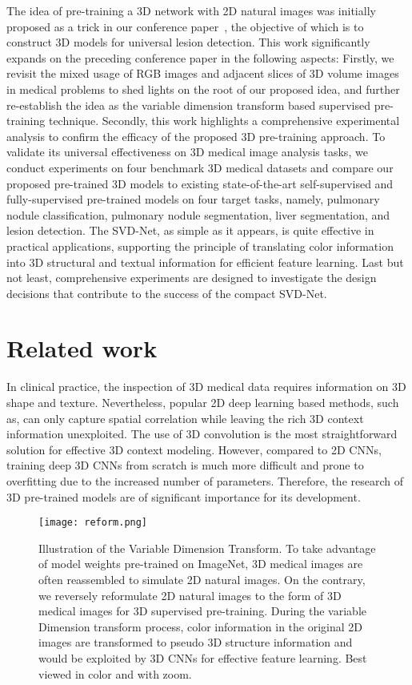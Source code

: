\documentclass[journal,twoside,web]{ieeecolor}
\begin{document}
The idea of pre-training a 3D network with 2D natural images was initially proposed as a trick in our conference paper~\cite{zhang2020revisiting}, the objective of which is to construct 3D models for universal lesion detection. This work significantly expands on the preceding conference paper in the following aspects: Firstly, we revisit the mixed usage of RGB images and adjacent slices of 3D volume images in medical problems to shed lights on the root of our proposed idea, and further re-establish the idea as the variable dimension transform based supervised pre-training technique. Secondly, this work highlights a comprehensive experimental analysis to confirm the efficacy of the proposed 3D pre-training approach. To validate its universal effectiveness on 3D medical image analysis tasks, we conduct experiments on four benchmark 3D medical datasets and compare our proposed pre-trained 3D models to existing state-of-the-art self-supervised and fully-supervised pre-trained models on four target tasks, namely, pulmonary nodule classification, pulmonary nodule segmentation, liver segmentation, and lesion detection. The SVD-Net, as simple as it appears, is quite effective in practical applications, supporting the principle of translating color information into 3D structural and textual information for efficient feature learning. Last but not least, comprehensive experiments are designed to investigate the design decisions that contribute to the success of the compact SVD-Net.



\section{Related work}



In clinical practice, the inspection of 3D medical data requires information on 3D shape and texture. Nevertheless, popular 2D deep learning based methods, such as\cite{roth2014new}, can only capture spatial correlation while leaving the rich 3D context information unexploited. The use of 3D convolution is the most straightforward solution for effective 3D context modeling. However, compared to 2D CNNs, training deep 3D CNNs from scratch is much more difficult and prone to overfitting due to the increased number of parameters. Therefore, the research of 3D pre-trained models are of significant importance for its development.

\begin{figure*}[!tbp]
    \centering
	\texttt{[image: reform.png]}
	\caption{Illustration of the Variable Dimension Transform. 
To take advantage of model weights pre-trained on ImageNet, 3D medical images are often reassembled to simulate 2D natural images. On the contrary, we reversely reformulate 2D natural images to the form of 3D medical images for 3D supervised pre-training. During the variable Dimension transform process, color information in the original 2D images are transformed to pseudo 3D structure information and would be exploited by 3D CNNs for effective feature learning. Best viewed in color and with zoom.}
	\label{reform}
\end{figure*}
\end{document}
